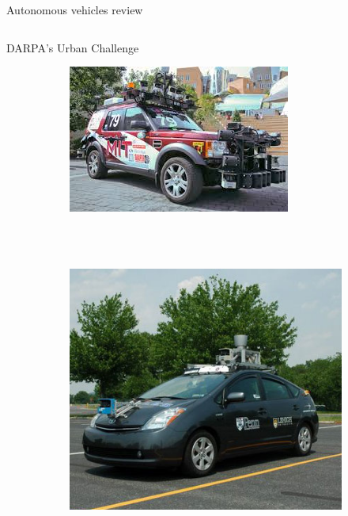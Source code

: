 \begin{frame}{Autonomous vehicles review}
\begin{columns}[T]
\begin{center}
\begin{overlayarea}{\textwidth}{\textheight}
{\begin{block}{DARPA's Urban Challenge}
\begin{figure}[t]
\begin{subfigure}[b]{0.4\textwidth}
		      \includegraphics[width=\textwidth]{talos}
		    \end{subfigure}
		    \\~\\
		    \begin{subfigure}[b]{0.4\textwidth}
		      \includegraphics[width=\textwidth]{littleben}
		    \end{subfigure}
		    ~
		    \begin{subfigure}[b]{0.4\textwidth}

\end{subfigure}
\end{figure}
\end{block}}
\end{overlayarea}
\end{center}
\end{columns}
\end{frame}
